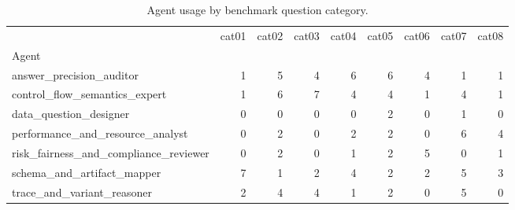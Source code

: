 \begin{table}
\caption{Agent usage by benchmark question category.}
\label{tab:agent-usage-by-category}
\begin{tabular}{lrrrrrrrr}
\toprule
 & cat01 & cat02 & cat03 & cat04 & cat05 & cat06 & cat07 & cat08 \\
Agent &  &  &  &  &  &  &  &  \\
\midrule
answer\_precision\_auditor & 1 & 5 & 4 & 6 & 6 & 4 & 1 & 1 \\
control\_flow\_semantics\_expert & 1 & 6 & 7 & 4 & 4 & 1 & 4 & 1 \\
data\_question\_designer & 0 & 0 & 0 & 0 & 2 & 0 & 1 & 0 \\
performance\_and\_resource\_analyst & 0 & 2 & 0 & 2 & 2 & 0 & 6 & 4 \\
risk\_fairness\_and\_compliance\_reviewer & 0 & 2 & 0 & 1 & 2 & 5 & 0 & 1 \\
schema\_and\_artifact\_mapper & 7 & 1 & 2 & 4 & 2 & 2 & 5 & 3 \\
trace\_and\_variant\_reasoner & 2 & 4 & 4 & 1 & 2 & 0 & 5 & 0 \\
\bottomrule
\end{tabular}
\end{table}
